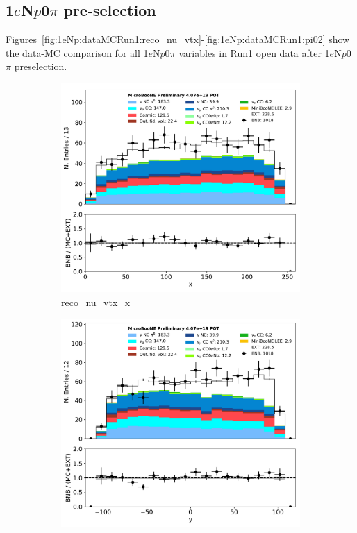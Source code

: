 \documentclass[a4paper]{article}
\newcommand{\npsel}{1$e$N$p$0$\pi$ }
\begin{document}
\subsection{\npsel pre-selection}

Figures~\ref{fig:1eNp:dataMCRun1:reco_nu_vtx}-\ref{fig:1eNp:dataMCRun1:pi02} show the data-MC comparison for all \npsel variables in Run1 open data after \npsel preselection.

\begin{figure}[H] 
\begin{center}
    \begin{subfigure}[b]{0.3\textwidth}
    \centering
    \includegraphics[width=1.00\textwidth]{1eNp/dataMCRun1/reco_nu_vtx_x01152020.pdf}
    \caption{\label{fig:1eNp:dataMCRun1:reco_nu_vtx_x} reco\_nu\_vtx\_x }
    \end{subfigure}
    \begin{subfigure}[b]{0.3\textwidth}
    \centering
    \includegraphics[width=1.00\textwidth]{1eNp/dataMCRun1/reco_nu_vtx_y01152020.pdf}

\end{subfigure}
\end{center}
\end{figure}
\end{document}
